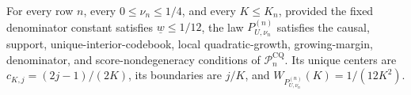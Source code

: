 For every row \(n\), every \(0\leq\nu_n\leq1/4\), and every \(K\leq K_n\), provided the fixed denominator constant satisfies \(\underline w\leq1/12\), the law \(P_{U,\nu_n}^{(n)}\) satisfies the causal, support, unique-interior-codebook, local quadratic-growth, growing-margin, denominator, and score-nondegeneracy conditions of \(\mathcal P_n^{\mathrm{CQ}}\). Its unique centers are \(c_{K,j}=(2j-1)/(2K)\), its boundaries are \(j/K\), and \(W_{P_{U,\nu_n}^{(n)}}(K)=1/(12K^2)\).
